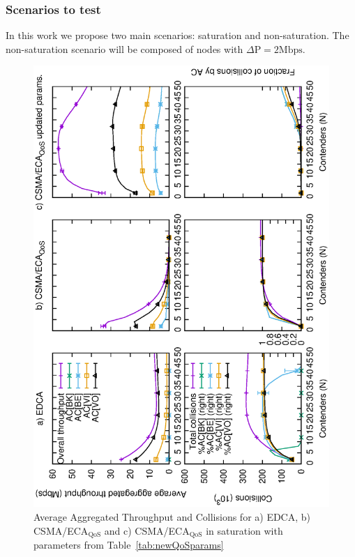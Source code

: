 \subsubsection{Scenarios to test}
In this work we propose two main scenarios: saturation and non-saturation. The non-saturation scenario will be composed of nodes with $\Delta\text{P}=2\text{Mbps}$.


\begin{figure}[tb]
	\centering
		\includegraphics[width=0.55\linewidth,angle = -90]{figures/multiplot-sat-perfect.eps}
		\caption{Average Aggregated Throughput and Collisions for a) EDCA, b) CSMA/ECA$_{\text{QoS}}$ and c) CSMA/ECA$_{\text{QoS}}$ in saturation with parameters from Table~\ref{tab:newQoSparams}}
		\label{fig:multiplotSat}
\end{figure}

